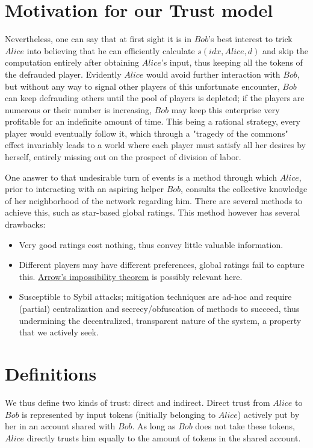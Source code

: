 \section{Motivation for our Trust model}
  Nevertheless, one can say that at first sight it is in $Bob$'s best interest to trick $Alice$ into believing that he can
  efficiently calculate $s\left(idx, Alice, d\right)$ and skip the computation entirely after obtaining $Alice$'s input,
  thus keeping all the tokens of the defrauded player. Evidently $Alice$ would avoid further interaction with $Bob$, but
  without any way to signal other players of this unfortunate encounter, $Bob$ can keep defrauding others until the pool of
  players is depleted; if the players are numerous or their number is increasing, $Bob$ may keep this enterprise very
  profitable for an indefinite amount of time. This being a rational strategy, every player would eventually follow it, which
  through a "tragedy of the commons" effect invariably leads to a world where each player must satisfy all her desires by
  herself, entirely missing out on the prospect of division of labor.

  One answer to that undesirable turn of events is a method through which $Alice$, prior to interacting with an aspiring
  helper $Bob$, consults the collective knowledge of her neighborhood of the network regarding him. There are several
  methods to achieve this, such as star-based global ratings. This method however has several drawbacks:

  \begin{itemize}
    \item Very good ratings cost nothing, thus convey little valuable information.
    \item Different players may have different preferences, global ratings fail to capture this.
    \href{https://en.wikipedia.org/wiki/Arrow\%27s_impossibility_theorem}{Arrow's impossibility theorem} is possibly relevant
    here.
    \item Susceptible to Sybil attacks; mitigation techniques are ad-hoc and require (partial) centralization and
    secrecy/obfuscation of methods to succeed, thus undermining the decentralized, transparent nature of the system, a
    property that we actively seek.
  \end{itemize}

\section{Definitions}
  We thus define two kinds of trust: direct and indirect. Direct trust from $Alice$ to $Bob$ is represented by input tokens
  (initially belonging to $Alice$) actively put by her in an account shared with $Bob$. As long as $Bob$ does not take these
  tokens, $Alice$ directly trusts him equally to the amount of tokens in the shared account.
  
